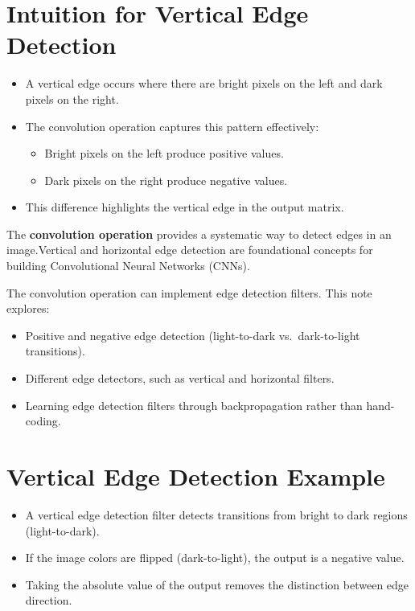 \documentclass[letterpaper,12pt,notitlepage,twoside]{report}
\begin{document}
\section*{Intuition for Vertical Edge Detection}
\begin{itemize}
    \item A vertical edge occurs where there are bright pixels on the left and dark pixels on the right.
    \item The convolution operation captures this pattern effectively:
    \begin{itemize}
        \item Bright pixels on the left produce positive values.
        \item Dark pixels on the right produce negative values.
    \end{itemize}
    \item This difference highlights the vertical edge in the output matrix.
\end{itemize}

The \textbf{convolution operation} provides a systematic way to detect edges in an image.Vertical and horizontal edge detection are foundational concepts for building Convolutional Neural Networks (CNNs).


The convolution operation can implement edge detection filters. This note explores:
\begin{itemize}
    \item Positive and negative edge detection (light-to-dark vs.~dark-to-light transitions).
    \item Different edge detectors, such as vertical and horizontal filters.
    \item Learning edge detection filters through backpropagation rather than hand-coding.
\end{itemize}

\section{Vertical Edge Detection Example}
\begin{itemize}
    \item A vertical edge detection filter detects transitions from bright to dark regions (light-to-dark).
    \item If the image colors are flipped (dark-to-light), the output is a negative value.
    \item Taking the absolute value of the output removes the distinction between edge direction.
\end{itemize}
\end{document}
